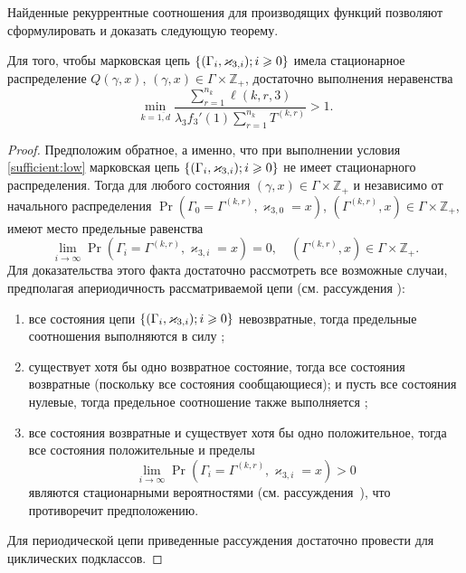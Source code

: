 Найденные рекуррентные соотношения для производящих функций позволяют сформулировать и доказать следующую теорему.
\begin{theorem}
Для того,  чтобы марковская цепь $\MarkThree$ имела стационарное распределение $Q(\gamma, x)$,  $(\gamma, x)\in \Gamma \times {\mathbb Z}_+$, достаточно выполнения неравенства 
\begin{equation}
\min_{k=\overline{1, d}} { \frac{\sum_{r = 1}^{n_k} \ell(k, r, 3) }{\lambda_3 f_3'(1) \sum_{r=1}^{n_k} T^{(k, r)} }}>1.
\label{sufficient:low}
\end{equation}
\label{sufficient:low:theorem}
\end{theorem}
\begin{proof}
Предположим обратное,  а именно,  что при выполнении условия \eqref{sufficient:low} марковская цепь $\MarkThree$ не имеет стационарного распределения. 
Тогда для любого состояния $(\gamma, x)\in \Gamma \times {\mathbb Z}_+$ и независимо от начального распределения $\Pr(\Gamma_{0}=\Gamma^{(k, r)},  \varkappa_{3, 0}=x)$, 
$(\Gamma^{(k, r)}, x)\in \Gamma \times {\mathbb Z}_+$,  
имеют место предельные равенства 
\begin{equation}
\lim_{i \to \infty} \Pr(\Gamma_{i}=\Gamma^{(k, r)},  \varkappa_{3, i}=x) =0,  \quad  (\Gamma^{(k, r)}, x)\in \Gamma \times {\mathbb Z}_+.
\label{zero:limit:equations}
\end{equation} 
Для доказательства этого факта достаточно рассмотреть все возможные случаи,  предполагая апериодичность рассматриваемой цепи (см. рассуждения \cite[гл. $3$, \S~3-4]{Shiryaev}):
\begin{enumerate}
\item все состояния цепи $\MarkThree$ невозвратные,  тогда предельные соотношения выполняются в силу \cite[с. 541,  лемма $2$]{Shiryaev};
\item существует хотя бы одно возвратное состояние,  тогда все состояния возвратные (поскольку все состояния сообщающиеся); и пусть все состояния нулевые,  тогда предельное соотношение также выполняется \cite[с. 541,  лемма $3$]{Shiryaev};
\item все состояния возвратные и существует хотя бы одно положительное,  тогда все состояния положительные и пределы 
$$
\lim_{i \to \infty} \Pr(\Gamma_{i}=\Gamma^{(k, r)},  \varkappa_{3, i}=x) > 0
$$
являются стационарными вероятностями (см. рассуждения~{\cite[с. 549,  теорема $1$]{Shiryaev}}),  что противоречит предположению.
\end{enumerate}
Для периодической цепи приведенные рассуждения достаточно провести для циклических подклассов.


\end{proof}
